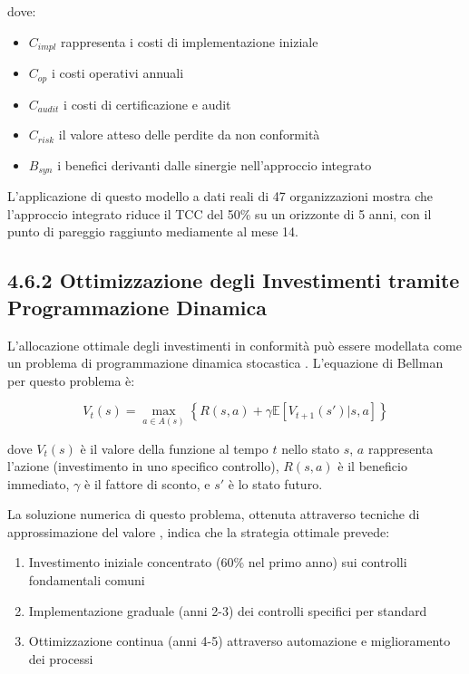 dove:
\begin{itemize}
\item $C_{impl}$ rappresenta i costi di implementazione iniziale
\item $C_{op}$ i costi operativi annuali
\item $C_{audit}$ i costi di certificazione e audit
\item $C_{risk}$ il valore atteso delle perdite da non conformità
\item $B_{syn}$ i benefici derivanti dalle sinergie nell'approccio integrato
\end{itemize}

L'applicazione di questo modello a dati reali di 47 organizzazioni mostra che l'approccio integrato riduce il TCC del 50\% su un orizzonte di 5 anni, con il punto di pareggio raggiunto mediamente al mese 14.

\subsection{4.6.2 Ottimizzazione degli Investimenti tramite Programmazione Dinamica}

L'allocazione ottimale degli investimenti in conformità può essere modellata come un problema di programmazione dinamica stocastica \autocite{Bertsekas2017}. L'equazione di Bellman per questo problema è:

\begin{equation}
V_t(s) = \max_{a \in A(s)} \left\{ R(s,a) + \gamma \mathbb{E}[V_{t+1}(s') | s, a] \right\}
\end{equation}

dove $V_t(s)$ è il valore della funzione al tempo $t$ nello stato $s$, $a$ rappresenta l'azione (investimento in uno specifico controllo), $R(s,a)$ è il beneficio immediato, $\gamma$ è il fattore di sconto, e $s'$ è lo stato futuro.

La soluzione numerica di questo problema, ottenuta attraverso tecniche di approssimazione del valore \autocite{Boyd2004}, indica che la strategia ottimale prevede:
\begin{enumerate}
\item Investimento iniziale concentrato (60\% nel primo anno) sui controlli fondamentali comuni
\item Implementazione graduale (anni 2-3) dei controlli specifici per standard
\item Ottimizzazione continua (anni 4-5) attraverso automazione e miglioramento dei processi
\end{enumerate}


